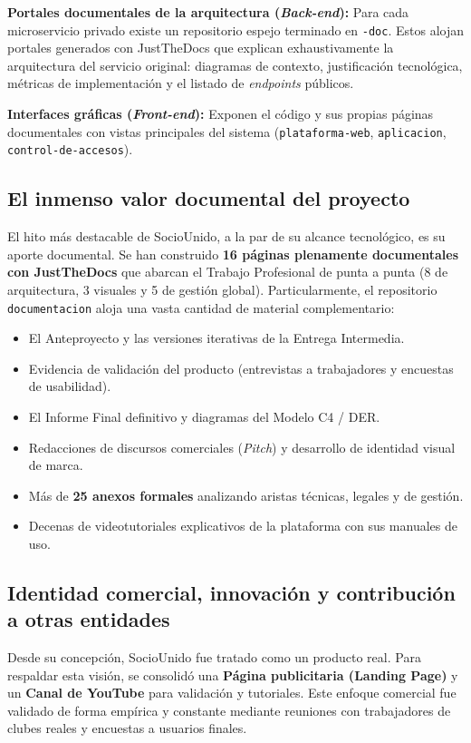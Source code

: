 \documentclass[conference, a4paper]{IEEEtran}
\begin{document}
\textbf{Portales documentales de la arquitectura (\textit{Back-end}):} Para cada microservicio privado existe un repositorio espejo terminado en \texttt{-doc}. Estos alojan portales generados con JustTheDocs que explican exhaustivamente la arquitectura del servicio original: diagramas de contexto, justificaci\'on tecnol\'ogica, m\'etricas de implementaci\'on y el listado de \textit{endpoints} p\'ublicos.

\textbf{Interfaces gr\'aficas (\textit{Front-end}):} Exponen el c\'odigo y sus propias p\'aginas documentales con vistas principales del sistema (\texttt{plataforma-web}, \texttt{aplicacion}, \texttt{control-de-accesos}).

\subsection{El inmenso valor documental del proyecto}
El hito m\'as destacable de SocioUnido, a la par de su alcance tecnol\'ogico, es su aporte documental. Se han construido \textbf{16 p\'aginas plenamente documentales con JustTheDocs} que abarcan el Trabajo Profesional de punta a punta (8 de arquitectura, 3 visuales y 5 de gesti\'on global). Particularmente, el repositorio \texttt{documentacion} aloja una vasta cantidad de material complementario:

\begin{itemize}
    \item El Anteproyecto y las versiones iterativas de la Entrega Intermedia.
    \item Evidencia de validaci\'on del producto (entrevistas a trabajadores y encuestas de usabilidad).
    \item El Informe Final definitivo y diagramas del Modelo C4 / DER.
    \item Redacciones de discursos comerciales (\textit{Pitch}) y desarrollo de identidad visual de marca.
    \item M\'as de \textbf{25 anexos formales} analizando aristas t\'ecnicas, legales y de gesti\'on.
    \item Decenas de videotutoriales explicativos de la plataforma con sus manuales de uso.
\end{itemize}

\subsection{Identidad comercial, innovaci\'on y contribuci\'on a otras entidades}
Desde su concepci\'on, SocioUnido fue tratado como un producto real. Para respaldar esta visi\'on, se consolid\'o una \textbf{P\'agina publicitaria (Landing Page)} y un \textbf{Canal de YouTube} para validaci\'on y tutoriales. Este enfoque comercial fue validado de forma emp\'irica y constante mediante reuniones con trabajadores de clubes reales y encuestas a usuarios finales.
\end{document}
